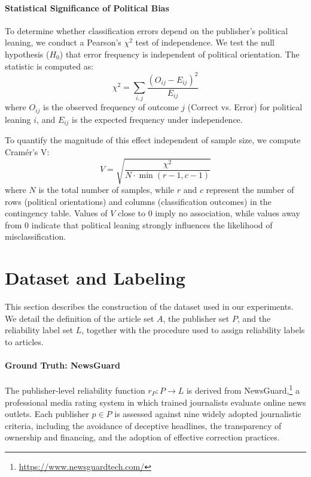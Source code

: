 \documentclass[journal]{IEEEtran}
\begin{document}
\paragraph{Statistical Significance of Political Bias}
To determine whether classification errors depend on the publisher's political leaning, we conduct a Pearson's $\chi^2$ test of independence. We test the null hypothesis ($H_0$) that error frequency is independent of political orientation. The statistic is computed as:
\begin{equation}
\chi^2 = \sum_{i,j} \frac{(O_{ij} - E_{ij})^2}{E_{ij}}
\end{equation}
where $O_{ij}$ is the observed frequency of outcome $j$ (Correct vs. Error) for political leaning $i$, and $E_{ij}$ is the expected frequency under independence.

To quantify the magnitude of this effect independent of sample size, we compute Cramér's V:
\begin{equation}
V = \sqrt{\frac{\chi^2}{N \cdot \min(r-1, c-1)}}
\end{equation}
where $N$ is the total number of samples, while $r$ and $c$ represent the number of rows (political orientations) and columns (classification outcomes) in the contingency table. Values of $V$ close to 0 imply no association, while values away from 0 indicate that political leaning strongly influences the likelihood of misclassification.

\section{Dataset and Labeling}
\label{sec:dataset}

This section describes the construction of the dataset used in our experiments. 
We detail the definition of the article set \(A\), the publisher set \(P\), and the reliability label set \(L\), together with the procedure used to assign reliability labels to articles.

\paragraph{Ground Truth: NewsGuard}
\label{sec:newsguard}

The publisher-level reliability function \(r_P : P \rightarrow L\) is derived from NewsGuard,\footnote{\url{https://www.newsguardtech.com/}} a professional media rating system in which trained journalists evaluate online news outlets.
Each publisher \(p \in P\) is assessed against nine widely adopted journalistic criteria, including the avoidance of deceptive headlines, the transparency of ownership and financing, and the adoption of effective correction practices.
\end{document}
